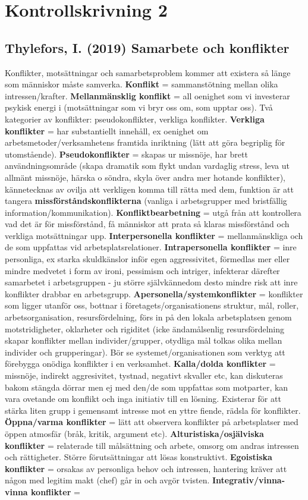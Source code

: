 \documentclass{report}
\begin{document}
\chapter{Kontrollskrivning 2}
\newpage\section{Thylefors, I. (2019) Samarbete och konflikter}
Konflikter, motsättningar och samarbetsproblem kommer att existera så länge som människor måste samverka. \textbf{Konflikt} = sammanstötning mellan olika intressen/krafter. \textbf{Mellanmänsklig konflikt} = all oenighet som vi investerar psykisk energi i (motsättningar som vi bryr oss om, som upptar oss). Två kategorier av konflikter: pseudokonflikter, verkliga konflikter. \textbf{Verkliga konflikter} = har substantiellt innehåll, ex oenighet om arbetsmetoder/verksamhetens framtida inriktning (lätt att göra begriplig för utomstående). \textbf{Pseudokonflikter} = skapas ur missnöje, har brett användningsområde (skapa dramatik som flykt undan vardaglig stress, leva ut allmänt missnöje, härska o söndra, skyla över andra mer hotande konflikter), kännetecknas av ovilja att verkligen komma till rätta med dem, funktion är att tangera \textbf{missförståndskonflikterna} (vanliga i arbetsgrupper med bristfällig information/kommunikation). \textbf{Konfliktbearbetning} = utgå från att kontrollera vad det är för missförstånd, få människor att prata så klaras missförstånd och verkliga motsättningar upp. \textbf{Interpersonella konflikter} = mellanmänskliga och de som uppfattas vid arbetsplatsrelationer. \textbf{Intrapersonella konflikter} = inre personliga, ex starka skuldkänslor inför egen aggressivitet, förmedlas mer eller mindre medvetet i form av ironi, pessimism och intriger, infekterar därefter samarbetet i arbetsgruppen - ju större självkännedom desto mindre risk att inre konflikter drabbar en arbetsgrupp. \textbf{Apersonella/systemkonflikter} = konflikter som ligger utanför oss, bottnar i företagets/organisationens struktur, mål, roller, arbetsorganisation, resursfördelning, förs in på den lokala arbetsplatsen genom motstridigheter, oklarheter och rigiditet (icke ändamålsenlig resursfördelning skapar konflikter mellan individer/grupper, otydliga mål tolkas olika mellan individer och grupperingar). Bör se systemet/organisationen som verktyg att förebygga onödiga konflikter i en verksamhet. \textbf{Kalla/dolda konflikter} = missnöje, indirekt aggresivitet, tystnad, negativt skvaller etc, kan diskuteras bakom stängda dörrar men ej med den/de som uppfattas som motparter, kan vara ovetande om konflikt och inga initiativ till en lösning. Existerar för att stärka liten grupp i gemensamt intresse mot en yttre fiende, rädsla för konflikter. \textbf{Öppna/varma konflikter} = lätt att observera konflikter på arbetsplatser med öppen atmosfär (bråk, kritik, argument etc). \textbf{Alturistiska/osjälviska konflikter} = relaterade till målsättning och arbete, omsorg om andras intressen och rättigheter. Större förutsättningar att lösas konstruktivt. \textbf{Egoistiska konflikter} = orsakas av personliga behov och intressen, hantering kräver att någon med legitim makt (chef) går in och avgör tvisten. \textbf{Integrativ/vinna-vinna konflikter} = 
\end{document}
